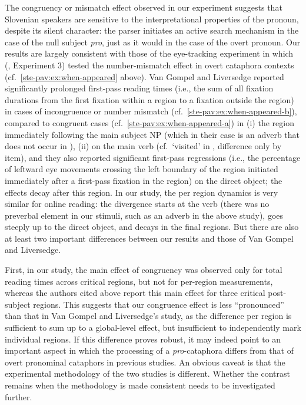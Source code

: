 \documentclass[output=paper,colorlinks,citecolor=brown]{langscibook}
\begin{document}
The congruency or mismatch effect observed in our experiment suggests that Slovenian speakers are sensitive to the interpretational properties of the pronoun, despite its silent character: the parser initiates an active search mechanism in the case of the null subject \textit{pro}, just as it would in the case of the overt pronoun. Our results are largely consistent with those of the eye-tracking experiment in which \citeauthor{vanGompelLiversedge2003} (\citeyear{vanGompelLiversedge2003}, Experiment 3) tested the number-mismatch effect in overt cataphora contexts (cf.\ \ref{ste-pav:ex:when-appeared} above). Van Gompel and Liversedge reported significantly prolonged first-pass reading times (i.e., the sum of all fixation durations from the first fixation within a region to a fixation outside the region) in cases of incongruence or number mismatch (cf.\ \ref{ste-pav:ex:when-appeared-b}), compared to congruent cases (cf.\ \ref{ste-pav:ex:when-appeared-a}) in (i) the region immediately following the main subject NP (which in their case is an adverb that does not occur in ), (ii) on the main verb (cf.\ `visited' in , difference only by item), and they also reported significant first-pass regressions (i.e., the percentage of leftward eye movements crossing the left boundary of the region initiated immediately after a first-pass fixation in the region) on the direct object; the effects decay after this region. In our study, the per region dynamics is very similar for online reading: the divergence starts at the verb (there was no preverbal element in our stimuli, such as an adverb in the above study), goes steeply up to the direct object, and decays in the final regions. But there are also at least two important differences between our results and those of Van Gompel and Liversedge.

First, in our study, the main effect of congruency was observed only for total reading times across critical regions, but not for per-region measurements, whereas the authors cited above report this main effect for three critical post-subject regions. This suggests that our congruence effect is less ``pronounced'' than that in Van Gompel and Liversedge’s study, as the difference per region is sufficient to sum up to a global-level effect, but insufficient to independently mark individual regions. If this difference proves robust, it may indeed point to an important aspect in which the processing of a \textit{pro}-cataphora differs from that of overt pronominal cataphors in previous studies. An obvious caveat is that the experimental methodology of the two studies is different. Whether the contrast remains when the methodology is made consistent needs to be investigated further.\largerpage
\end{document}
